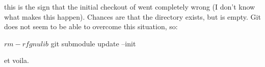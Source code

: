 
\noindent
this is the sign that the initial checkout of  went
completely wrong (I don't know what makes this happen).  Chances are
that the directory exists, but is empty.  Git does not seem to be able
to overcome this situation, so:

\begin{shell}
$ rm -rf gnulib
$ git submodule update --init
\end{shell}

\noindent
et voila.

